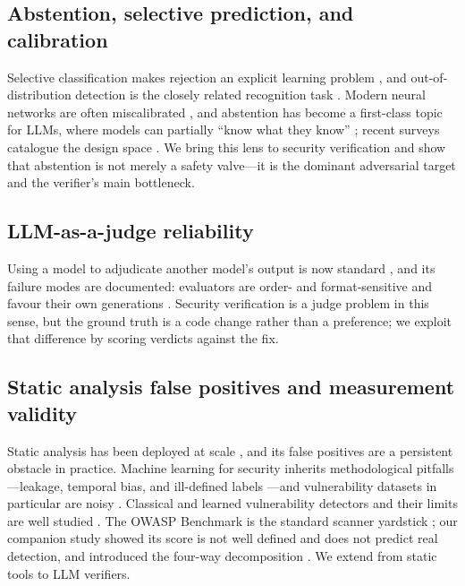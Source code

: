 \documentclass[conference]{IEEEtran}
\begin{document}
\subsection{Abstention, selective prediction, and calibration}
Selective classification makes rejection an explicit learning problem
\cite{geifman2017selective}, and out-of-distribution detection is the closely
related recognition task \cite{hendrycks2017baseline}. Modern neural networks are
often miscalibrated \cite{guo2017calibration}, and abstention has become a
first-class topic for LLMs, where models can partially ``know what they know''
\cite{kadavath2022language}; recent surveys catalogue the design space
\cite{wen2025know}. We bring this lens to security verification and show that abstention is not merely a safety valve---it is
the dominant adversarial target and the verifier's main bottleneck.

\subsection{LLM-as-a-judge reliability}
Using a model to adjudicate another model's output is now standard
\cite{zheng2023judging,liu2023geval}, and its failure modes are documented:
evaluators are order- and format-sensitive \cite{wang2024fair} and favour their own
generations \cite{panickssery2024llm}. Security verification is a judge problem in
this sense, but the ground truth is a code change rather than a preference; we
exploit that difference by scoring verdicts against the fix.

\subsection{Static analysis false positives and measurement validity}
Static analysis has been deployed at scale \cite{sadowski2018lessons}, and its false
positives are a persistent obstacle in practice. Machine learning for security
inherits methodological pitfalls---leakage, temporal bias, and ill-defined
labels \cite{arp2022dos}---and vulnerability datasets in particular are noisy
\cite{croft2023data}. Classical and learned vulnerability detectors and their
limits are well studied \cite{zhou2019devign,chakraborty2022deep,
ding2025vulnerability}. The OWASP Benchmark is the standard scanner yardstick
\cite{owaspbench}; our companion study showed its score is not well defined and does
not predict real detection, and introduced the four-way decomposition
\cite{sastaudit}. We extend \cite{sastaudit} from static tools to LLM verifiers.
\end{document}
